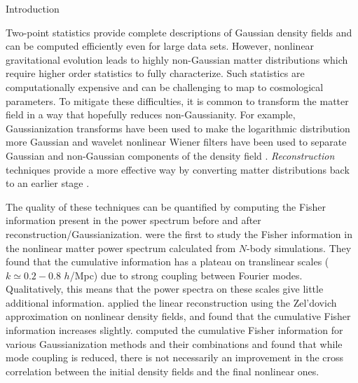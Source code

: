 \begin{section}{Introduction}\label{sec:introduction}  

  Two-point statistics provide complete descriptions of Gaussian
  density fields and can be computed efficiently even for large data
  sets.  However, nonlinear gravitational evolution leads to highly
  non-Gaussian matter distributions which require higher order
  statistics to fully characterize.  Such statistics are
  computationally expensive and can be challenging to map to
  cosmological parameters.  To mitigate these difficulties, it is
  common to transform the matter field in a way that hopefully reduces
  non-Gaussianity.  For example, Gaussianization transforms have been
  used to make the logarithmic distribution more Gaussian
  \citep{bib:Weinberg1992,bib:Mark2009} and wavelet nonlinear Wiener
  filters have been used to separate Gaussian and non-Gaussian
  components of the density field
  \citep{bib:Zhang2011,bib:Yu2012,bib:HarnoisD2013}.
  {\it Reconstruction} techniques \citep{bib:Daniel2007} provide a more
  effective way by converting matter distributions back to an
  earlier stage \citep{bib:HarnoisD2013}.

  The quality of these techniques can be quantified by computing the Fisher
  information \citep{bib:Rimes2006} present in the power spectrum before and after
  reconstruction/Gaussianization.
  \citet{bib:Martin1999} were the first to study the Fisher information in the nonlinear
  matter power spectrum calculated from $N$-body simulations.  They
  found that the cumulative information has a plateau on translinear scales
  ($k \simeq 0.2-0.8$ $h$/Mpc) due to strong coupling between Fourier
  modes.  Qualitatively, this means that the power spectra on these
  scales give little additional information.  
  \citet{bib:Ngan2012} applied the linear reconstruction using the Zel'dovich approximation 
  on nonlinear density fields, and found that the cumulative Fisher information increases slightly.
  \citet{bib:HarnoisD2013} computed the cumulative Fisher information
  for various Gaussianization methods and their combinations
  and found that while mode coupling is reduced, there is not
  necessarily an improvement in the cross correlation between the
  initial density fields and the final nonlinear ones. 


\end{section}
